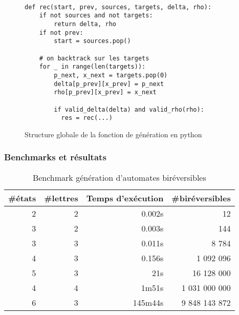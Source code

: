 \documentclass[11pt]{beamer}
\begin{document}
\begin{frame}[fragile]
\begin{figure}[!ht]
\begin{center}
\begin{Verbatim}[fontsize=\small]

def rec(start, prev, sources, targets, delta, rho):
    if not sources and not targets:
        return delta, rho
    if not prev:
        start = sources.pop()

    # on backtrack sur les targets
    for _ in range(len(targets)):
        p_next, x_next = targets.pop(0)
        delta[p_prev][x_prev] = p_next
        rho[p_prev][x_prev] = x_next

        if valid_delta(delta) and valid_rho(rho):
          res = rec(...)
\end{Verbatim}
\end{center}
  \caption{Structure globale de la fonction de génération en python\label{fig:gen-pseudo-code}}
\end{figure}
\end{frame}

\begin{frame}
  \frametitle{Benchmarks et résultats}
  \begin{table}[h!]
  \begin{center}
    \begin{threeparttable}
      \begin{tabular}{|rrrr|}
        \hline
        \#états & \#lettres & Temps d'exécution & \#biréversibles \\ [0.5ex]
        \hline\hline
        2 & 2 & 0.002s & 12 \\
        \hline
        3 & 2 & 0.003s & 144 \\
        \hline
        3 & 3 & 0.011s & 8 784 \\
        \hline
        4 & 3 & 0.156s & 1 092 096 \\
        \hline
        5 & 3 & 21s    & 16 128 000 \\
        \hline
        4 & 4 & 1m51s  & 1 031 000 000 \\
        \hline
        6 & 3 & 145m44s& 9 848 143 872 \\
        \hline
      \end{tabular}

      \caption{Benchmark génération d'automates biréversibles}
    \end{threeparttable}
  \end{center}
\end{table}
\end{frame}
\end{document}
